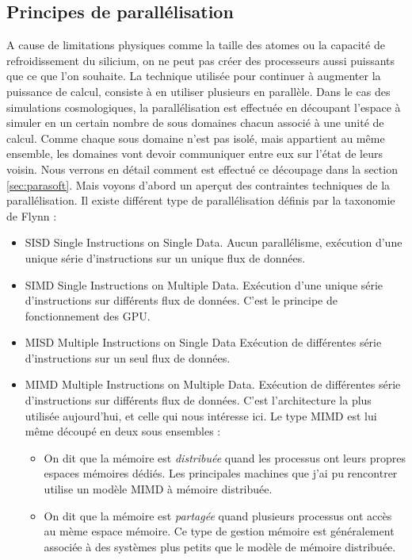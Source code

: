 \subsection{Principes de parallélisation}

A cause de limitations physiques comme la taille des atomes ou la capacité de refroidissement du silicium, on ne peut pas créer des processeurs aussi puissants que ce que l'on souhaite.
La technique utilisée pour continuer à augmenter la puissance de calcul, consiste à en utiliser plusieurs en parallèle.
Dans le cas des simulations cosmologiques, la parallélisation est effectuée en découpant l'espace à simuler en un certain nombre de sous domaines chacun associé à une unité de calcul.
Comme chaque sous domaine n'est pas isolé, mais appartient au même ensemble, les domaines vont devoir communiquer entre eux sur l'état de leurs voisin.
Nous verrons en détail comment est effectué ce découpage dans la section \ref{sec:parasoft}.
Mais voyons d'abord un aperçut des contraintes techniques de la parallélisation.
Il existe différent type de parallélisation définis par la taxonomie de Flynn \citep{Flynn:1972:COE:1952456.1952459}: 

\begin{itemize}
\item SISD Single Instructions on Single Data.
Aucun parallélisme, exécution d'une unique série d'instructions sur un unique flux de données.

\item SIMD Single Instructions on Multiple Data.
Exécution d'une unique série d'instructions sur différents flux de données.
C'est le principe de fonctionnement des GPU.

\item MISD Multiple Instructions on Single Data 
Exécution de différentes série d'instructions sur un seul flux de données.

\item MIMD Multiple Instructions on Multiple Data.
Exécution de différentes série d'instructions sur différents flux de données.
C'est l’architecture la plus utilisée aujourd'hui, et celle qui nous intéresse ici.
Le type MIMD est lui même découpé en deux sous ensembles : 

\begin{itemize}
\item On dit que la mémoire est \textit{distribuée} quand les processus ont leurs propres espaces mémoires dédiés.
Les principales machines que j'ai pu rencontrer utilise un modèle MIMD à mémoire distribuée.

\item On dit que la mémoire est \textit{partagée} quand plusieurs processus ont accès au mème espace mémoire.
Ce type de gestion mémoire est généralement associée à des systèmes plus petits que le modèle de mémoire distribuée.
\end{itemize}
\end{itemize}

